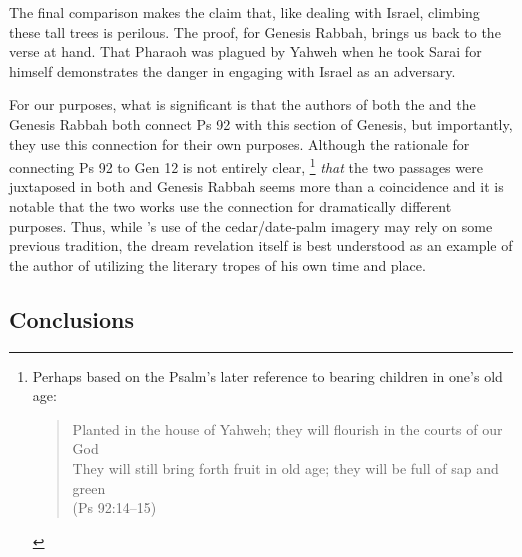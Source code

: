 The final comparison makes the claim that, like dealing with Israel, climbing these tall trees is perilous. The proof, for Genesis Rabbah, brings us back to the verse at hand. That Pharaoh was plagued by Yahweh when he took Sarai for himself demonstrates the danger in engaging with Israel as an adversary.

For our purposes, what is significant is that the authors of both the \ga and the Genesis Rabbah both connect Ps 92 with this section of Genesis, but importantly, they use this connection for their own purposes. Although the rationale for connecting Ps 92 to Gen 12 is not entirely clear,%
%
\footnote{%
\begin{SingleSpace}Perhaps based on the Psalm's later reference to bearing children in one's old age:
\begin{quote}
    Planted in the house of Yahweh; they will flourish in the courts of our God\\
    They will still bring forth fruit in old age; they will be full of sap and green\\
    (Ps 92:14--15)
\end{quote}
\end{SingleSpace}}
%
\emph{that} the two passages were juxtaposed in both \ga and Genesis Rabbah seems more than a coincidence and it is notable that the two works use the connection for dramatically different purposes. Thus, while \ga's use of the cedar/date-palm imagery may rely on some previous tradition, the dream revelation itself is best understood as an example of the author of \ga utilizing the literary tropes of his own time and place. 



\subsection{Conclusions}

